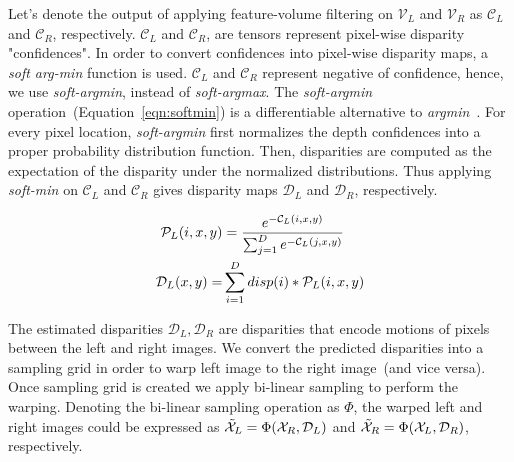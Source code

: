 \documentclass[runningheads]{llncs}
\begin{document}
Let's denote the output of applying feature-volume filtering on $\mathcal{V}_{L}$ and $\mathcal{V}_{R}$ as $\mathcal{C}_{L}$ and $\mathcal{C}_{R}$, respectively. $\mathcal{C}_{L}$ and $\mathcal{C}_{R}$, are tensors represent pixel-wise disparity "confidences". In order to convert confidences into pixel-wise disparity maps, a \textit{soft arg-min} function is used. $\mathcal{C}_{L}$ and $\mathcal{C}_{R}$ represent negative of confidence, hence, we use \textit{soft-argmin}, instead of \textit{soft-argmax}. The \textit{soft-argmin} operation~(Equation~\ref{eqn:softmin}) is a differentiable alternative to \textit{argmin}~\cite{gcnet}. For every pixel location, \textit{soft-argmin} first normalizes the depth confidences into a proper probability distribution function. Then, disparities are computed as the expectation of the disparity under the normalized distributions. Thus applying \textit{soft-min} on $\mathcal{C}_{L}$ and $\mathcal{C}_{R}$ gives disparity maps $\mathcal{D}_{L}$ and $\mathcal{D}_{R}$, respectively.

\begin{equation}
    \begin{aligned}
        \mathcal{P}_{L}(i,x,y) &= \frac{e^{-\mathcal{C}_{L}(i,x,y)}}{\sum_{j=1}^{D}{e^{-\mathcal{C}_{L}(j,x,y)}}}
    \vspace{0.1cm} \\
    \mathcal{D}_{L}(x,y) =& \sum_{i=1}^{D}{disp(i)*\mathcal{P}_{L}(i,x,y)}
    \end{aligned}
    \label{eqn:softmin}
\end{equation}

The estimated disparities $\mathcal{D}_{L}, \mathcal{D}_{R}$ are disparities that encode motions of pixels between the left and right images. We convert the predicted disparities into a sampling grid in order to warp left image to the right image~(and vice versa). Once sampling grid is created we apply bi-linear sampling \cite{jaderberg2015spatial} to perform the warping. Denoting the bi-linear sampling operation as $\Phi$, the warped left and right images could be expressed as $\Tilde{\mathcal{X}}_{L} = \Phi(\mathcal{X}_{R}, \mathcal{D}_{L})$ and $\Tilde{\mathcal{X}}_{R} = \Phi(\mathcal{X}_{L}, \mathcal{D}_{R})$, respectively.
\end{document}
